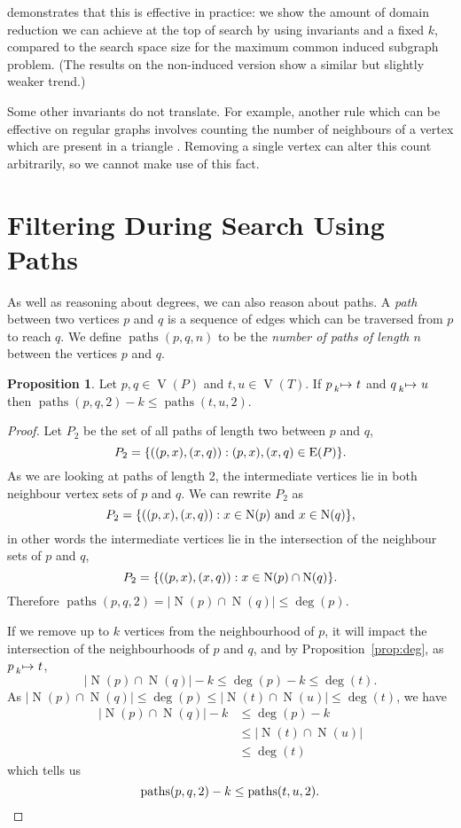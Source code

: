 \documentclass[letterpaper]{article}
\newcommand{\citep}[1]{\cite{#1}}
\theoremstyle{definition}
\newtheorem{proposition}{Proposition}
\newcommand{\paths}{\operatorname{paths}}
\newcommand{\lessmap}[1]{\prescript{}{#1}{\mapsto}\ }
\newcommand{\V}{\operatorname{V}}
\newcommand{\EdgeSet}{\operatorname{E}}
\newcommand{\N}{\operatorname{N}}
\begin{document}
 demonstrates that this is effective in practice: we show the amount of domain
reduction we can achieve at the top of search by using invariants and a fixed $k$, compared to the
search space size for the maximum common induced subgraph problem. (The results on the non-induced
version show a similar but slightly weaker trend.)

Some other invariants do not translate. For example, another rule which can be effective on regular
graphs involves counting the number of neighbours of a vertex which are present in a triangle
\citep{mckay2014practical}. Removing a single vertex can alter this count arbitrarily, so we cannot
make use of this fact.

\section{Filtering During Search Using Paths}\label{section:pathfiltering}

As well as reasoning about degrees, we can also reason about paths.  A \emph{path} between two
vertices $p$ and $q$ is a sequence of edges which can be traversed from $p$ to reach $q$. We define
$\paths(p,q,n)$ to be the \emph{number of paths of length $n$} between the vertices $p$ and $q$.

\begin{proposition}\label{prop:paths}
    Let $p,q \in \V(P)$ and $t,u\in \V(T)$. If $p \lessmap{k} t$ and $q \lessmap{k} u$ then
     $\paths(p, q, 2) - k \le \paths(t, u, 2)$.
\end{proposition}
\begin{proof}
Let $P_{2}$ be the set of all paths of length two between $p$ and $q$, \[P_{2} = \{((p,x),(x,q)) :
(p,x),(x,q)\in \EdgeSet(P) \}\textnormal{.}\] As we are looking at paths of length 2,
the intermediate vertices lie in both neighbour vertex sets of $p$ and $q$. We can rewrite
$P_{2}$ as \[P_{2} = \{((p,x),(x,q)) : x\in \N(p) \text{ and } x\in \N(q) \}\textnormal{,}\] in
other words the intermediate vertices lie in the intersection of the neighbour sets of $p$ and
$q$, \[ P_{2}=\{((p,x),(x,q)) : x\in \N(p)\cap \N(q) \} \textnormal{.}\] Therefore
$\paths(p,q,2) = \left| \N(p)\cap \N(q) \right|  \leq \deg(p)$.

If we remove up to $k$ vertices from the neighbourhood of $p$, it will impact the intersection of
    the neighbourhoods of $p$ and $q$, and by Proposition~\ref{prop:deg}, as $p\lessmap{k}t$,
\[
\left| \N(p)\cap \N(q)\right| - k \leq \deg(p) - k \leq \deg(t).
\]
As $\left|\N(p)\cap \N(q)\right|\leq \deg(p) \leq \left|\N(t)\cap \N(u)\right|\leq \deg(t)$, we have
\begin{align*}
\left|\N(p)\cap \N(q)\right| - k & \leq \deg(p) - k \\
 & \leq \left|\N(t)\cap \N(u)\right|\\
 & \leq \deg(t)
\end{align*}
which tells us
\[
\paths(p, q, 2) - k \leq \paths(t, u, 2). \qedhere
\]
\end{proof}
\end{document}
